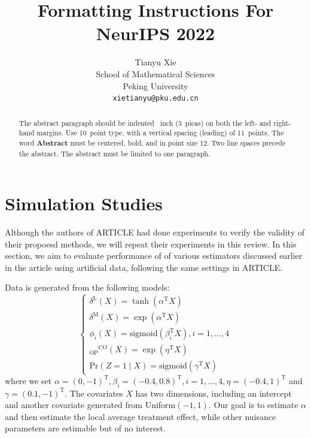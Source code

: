 \documentclass{article}
\title{Formatting Instructions For NeurIPS 2022}
\author{%
  Tianyu Xie \\
  School of Mathematical Sciences\\
  Peking University\\
  \texttt{xietianyu@pku.edu.cn} \\
}
\begin{document}
\maketitle


\begin{abstract}
  The abstract paragraph should be indented ~inch (3~picas) on
  both the left- and right-hand margins. Use 10~point type, with a vertical
  spacing (leading) of 11~points.  The word \textbf{Abstract} must be centered,
  bold, and in point size 12. Two line spaces precede the abstract. The abstract
  must be limited to one paragraph.
\end{abstract}



\section{Simulation Studies}
Although the authors of ARTICLE had done experiments to verify the validity of their propoesd methods, we will repeat their experiments in this review. In this section, we aim to evaluate performance of of various estimators discussed earlier in the article using artificial data, following the same settings in ARTICLE.

Data is generated from the following models:
\begin{equation}\label{generate}
\left\{
\begin{array}{l}
\delta^{\mathrm{L}}(X) =\tanh \left(\alpha^{\mathrm{T}} X\right)\\
\delta^{\mathrm{M}}(X) =\exp \left(\alpha^{\mathrm{T}} X\right) \\
\phi_{i}(X) =\mathrm{sigmoid}\left(\beta_{i}^{\mathrm{T}} X\right), i=1, \ldots, 4\\
{ }_{\mathrm{OP}}{ }^{\mathrm{CO}}(X) =\exp \left(\eta^{\mathrm{T}} X\right) \\
\mathrm{Pr}(Z=1 \mid X) =\mathrm{sigmoid}\left(\gamma^{\mathrm{T}} X\right)
\end{array}
\right.
\end{equation}
where we set $\alpha=(0,-1)^{\mathrm{T}}, \beta_{i}=(-0.4,0.8)^{\mathrm{T}},i=1, \ldots, 4, \eta=(-0.4,1)^{\mathrm{T}}$ and $\gamma=(0.1,-1)^{\mathrm{T}}$. The covariates $X$ has two dimensions, including an intercept and another covariate generated from Uniform$(-1,1)$. Our goal is to estimate $\alpha$ and then estimate the local average treatment effect, while other nuisance parameters are estimable but of no interest.
\end{document}
